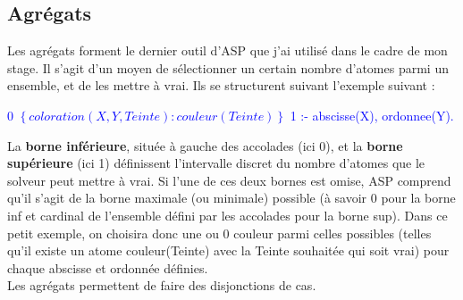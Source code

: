 \documentclass[12pt,a4paper]{article}
\begin{document}
\subsection{Agrégats}
Les agrégats forment le dernier outil d'ASP que j'ai utilisé dans le cadre de mon stage. Il s'agit d'un moyen de sélectionner un certain nombre d'atomes parmi un ensemble, et de les mettre à vrai. Ils se 
structurent suivant l'exemple suivant :
\begin{center}
\textcolor{blue}{
  0 $\left\{ coloration(X, Y, Teinte):couleur(Teinte)\right\}$ 1 :- abscisse(X), ordonnee(Y).
}
\end{center}
La \textbf{borne inférieure}, située à gauche des accolades (ici 0), et la \textbf{borne supérieure} (ici 1) définissent l'intervalle discret du nombre d'atomes que le solveur peut mettre à vrai. Si l'une de ces deux bornes est 
omise, ASP comprend qu'il s'agit de la borne maximale (ou minimale) possible (à savoir 0 pour la borne inf et cardinal de l'ensemble défini par les accolades pour la borne sup). Dans ce petit exemple, on choisira donc une ou 0 
couleur parmi celles possibles (telles qu'il existe un atome couleur(Teinte) avec la Teinte souhaitée qui soit vrai) pour chaque abscisse et ordonnée définies.\\
Les agrégats permettent de faire des disjonctions de cas.
\end{document}

